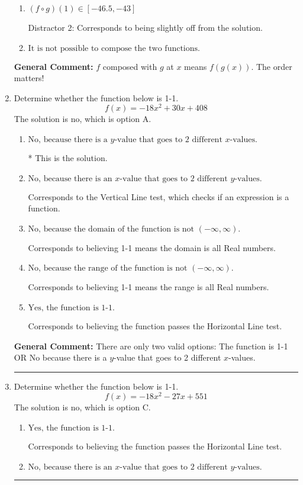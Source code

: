 \documentclass{extbook}[14pt]
\newcommand{\litem}[1]{\item #1

\rule{\textwidth}{0.4pt}}
\begin{document}
\begin{enumerate}
{\begin{enumerate}[label=\Alph*.]
 Distractor 3: Corresponds to being slightly off from the solution.
\item \( (f \circ g)(1) \in [-46.5, -43] \)

 Distractor 2: Corresponds to being slightly off from the solution.
\item \( \text{It is not possible to compose the two functions.} \)


\end{enumerate}

\textbf{General Comment:} $f$ composed with $g$ at $x$ means $f(g(x))$. The order matters!
}
\litem{
Determine whether the function below is 1-1.
\[ f(x) = -18 x^2 + 30 x + 408 \]The solution is \( \text{no} \), which is option A.\begin{enumerate}[label=\Alph*.]
\item \( \text{No, because there is a $y$-value that goes to 2 different $x$-values.} \)

* This is the solution.
\item \( \text{No, because there is an $x$-value that goes to 2 different $y$-values.} \)

Corresponds to the Vertical Line test, which checks if an expression is a function.
\item \( \text{No, because the domain of the function is not $(-\infty, \infty)$.} \)

Corresponds to believing 1-1 means the domain is all Real numbers.
\item \( \text{No, because the range of the function is not $(-\infty, \infty)$.} \)

Corresponds to believing 1-1 means the range is all Real numbers.
\item \( \text{Yes, the function is 1-1.} \)

Corresponds to believing the function passes the Horizontal Line test.
\end{enumerate}

\textbf{General Comment:} There are only two valid options: The function is 1-1 OR No because there is a $y$-value that goes to 2 different $x$-values.
}
\litem{
Determine whether the function below is 1-1.
\[ f(x) = -18 x^2 - 27 x + 551 \]The solution is \( \text{no} \), which is option C.\begin{enumerate}[label=\Alph*.]
\item \( \text{Yes, the function is 1-1.} \)

Corresponds to believing the function passes the Horizontal Line test.
\item \( \text{No, because there is an $x$-value that goes to 2 different $y$-values.} \)


\end{enumerate}}
\end{enumerate}
\end{document}
